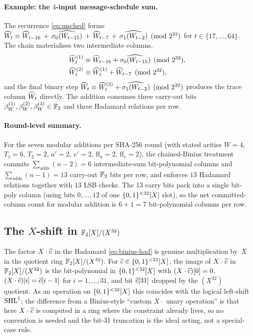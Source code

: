 \paragraph{Example: the $4$-input message-schedule sum.}
The recurrence \eqref{eq:msched} forms
$\widehat{W}_t \equiv \widehat{W}_{t-16}\, +\, \widehat{\sigma_0(W_{t-15})}\, +\,
\widehat{W}_{t-7}\, +\, \widehat{\sigma_1(W_{t-2})} \pmod{2^{32}}$ for
$t \in \{17, \dots, 64\}$. The chain materialises two intermediate
columns,
\begin{align*}
\widehat{W}_t^{(1)} &\equiv \widehat{W}_{t-16} + \widehat{\sigma_0(W_{t-15})} \pmod{2^{32}},\\
\widehat{W}_t^{(2)} &\equiv \widehat{W}_t^{(1)} + \widehat{W}_{t-7} \pmod{2^{32}},
\end{align*}
and the final binary step
$\widehat{W}_t \equiv \widehat{W}_t^{(2)} + \widehat{\sigma_1(W_{t-2})}
\pmod{2^{32}}$ produces the trace column $\widehat{W}_t$ directly. The
addition consumes three carry-out bits
$\beta_W^{(1)}, \beta_W^{(2)}, \beta_W^{(3)} \in \mathbb{F}_2$ and three
Hadamard relations per row.

\paragraph{Round-level summary.}
For the seven modular additions per SHA-256 round (with stated
arities $W = 4$, $T_1 = 6$, $T_2 = 2$, $a' = 2$, $e' = 2$,
$\mathrm{ff}_a = 2$, $\mathrm{ff}_e = 2$), the chained-Binius
treatment commits $\sum_{\text{adds}} (n - 2) = 6$ intermediate-sum
bit-polynomial columns and
$\sum_{\text{adds}} (n - 1) = 13$ carry-out $\mathbb{F}_2$ bits per row, and
enforces $13$ Hadamard relations together with $13$ LSB checks. The
$13$ carry bits pack into a single bit-poly column (using bits
$0,\dots,12$ of one $\{0,1\}^{<32}[X]$ slot), so the net committed-column
count for modular addition is $6 + 1 = 7$ bit-polynomial columns per
row.

\subsection{The \texorpdfstring{$X$}{X}-shift in
\texorpdfstring{$\mathbb{F}_2[X]/(X^{32})$}{F2[X]/(X\^{}32)}}\label{sec:xshift}

The factor $X\cdot\widehat{c}$ in the Hadamard \eqref{eq:binius-had} is
genuine multiplication by~$X$ in the quotient ring $\mathbb{F}_2[X]/(X^{32})$. For
$\widehat{c} \in \{0,1\}^{<32}[X]$, the image of $X\cdot\widehat{c}$ in $\mathbb{F}_2[X]/(X^{32})$
is the bit-polynomial in $\{0,1\}^{<32}[X]$ with
$(X\cdot\widehat{c})[0] = 0$, $(X\cdot\widehat{c})[i] = \widehat{c}[i-1]$ for $i =
1,\dots,31$, and bit $\widehat{c}[31]$ dropped by the $(X^{32})$ quotient.
As an operation on
$\{0,1\}^{<32}[X]$ this coincides with the logical left-shift $\operatorname{SHL}^{1}$;
the difference from a Binius-style ``custom $X\cdot$ unary operation''
is that here $X\cdot\widehat{c}$ is computed in a ring where the constraint
already lives, so no convention is needed and the bit-31 truncation is
the ideal acting, not a special-case rule.

